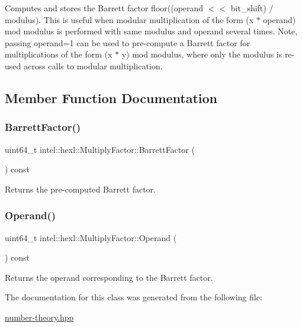 Computes and stores the Barrett factor floor((operand $<$$<$ bit\+\_\+shift) / modulus). This is useful when modular multiplication of the form (x $\ast$ operand) mod modulus is performed with same modulus and operand several times. Note, passing operand=1 can be used to pre-\/compute a Barrett factor for multiplications of the form (x $\ast$ y) mod modulus, where only the modulus is re-\/used across calls to modular multiplication. 



\subsection{Member Function Documentation}
\mbox{\label{classintel_1_1hexl_1_1MultiplyFactor_aa1708edda697a2ebb93f6b2b9b2967aa}} 
\subsubsection{\texorpdfstring{Barrett\+Factor()}{BarrettFactor()}}
{\footnotesize\ttfamily uint64\+\_\+t intel\+::hexl\+::\+Multiply\+Factor\+::\+Barrett\+Factor (\begin{DoxyParamCaption}{ }\end{DoxyParamCaption}) const\hspace{0.3cm}{\ttfamily [inline]}}



Returns the pre-\/computed Barrett factor. 

\mbox{\label{classintel_1_1hexl_1_1MultiplyFactor_a143d0ed636511f3cd450286b89687822}} 
\subsubsection{\texorpdfstring{Operand()}{Operand()}}
{\footnotesize\ttfamily uint64\+\_\+t intel\+::hexl\+::\+Multiply\+Factor\+::\+Operand (\begin{DoxyParamCaption}{ }\end{DoxyParamCaption}) const\hspace{0.3cm}{\ttfamily [inline]}}



Returns the operand corresponding to the Barrett factor. 



The documentation for this class was generated from the following file\+:\begin{DoxyCompactItemize}
\item 
\hyperlink{number-theory_8hpp}{number-\/theory.\+hpp}\end{DoxyCompactItemize}
